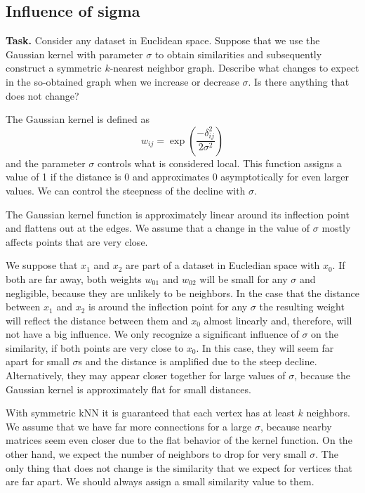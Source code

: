 \documentclass{support/acm_proc_article-sp}
\begin{document}
    \subsection{Influence of sigma}

    \textbf{Task.} Consider any dataset in Euclidean space.
    Suppose that we use the Gaussian kernel with parameter $\sigma$ to obtain similarities and subsequently construct
    a symmetric $k$-nearest neighbor graph.
    Describe what changes to expect in the so-obtained graph when we increase or decrease $\sigma$.
    Is there anything that does not change?

    The Gaussian kernel is defined as
    \begin{equation*}
        w_{ij} = \exp{\left(\frac{-\delta_{ij}^2}{2\sigma^2}\right)}
    \end{equation*}
    and the parameter $\sigma$ controls what is considered local.
    This function assigns a value of 1 if the distance is 0 and approximates 0 asymptotically for even larger values.
    We can control the steepness of the decline with $\sigma$.

    The Gaussian kernel function is approximately linear around its inflection point and flattens out at the edges.
    We assume that a change in the value of $\sigma$ mostly affects points that are very close.

    We suppose that $x_1$ and $x_2$ are part of a dataset in Eucledian space with $x_0$.
    If both are far away, both weights $w_{01}$ and $w_{02}$ will be small for any $\sigma$ and negligible, because
    they are unlikely to be neighbors.
    In the case that the distance between $x_1$ and $x_2$ is around the inflection point for any $\sigma$ the resulting
    weight will reflect the distance between them and $x_0$ almost linearly and, therefore, will not have a big influence.
    We only recognize a significant influence of $\sigma$ on the similarity, if both points are very close to $x_0$.
    In this case, they will seem far apart for small $\sigma$s and the distance is amplified due to
    the steep decline.
    Alternatively, they may appear closer together for large values of $\sigma$, because the Gaussian kernel
    is approximately flat for small distances.

    With symmetric kNN it is guaranteed that each vertex has at least $k$ neighbors.
    We assume that we have far more connections for a large $\sigma$, because nearby matrices seem even closer due to
    the flat behavior of the kernel function.
    On the other hand, we expect the number of neighbors to drop for very small $\sigma$.
    The only thing that does not change is the similarity that we expect for vertices that are far apart.
    We should always assign a small similarity value to them.
\end{document}
